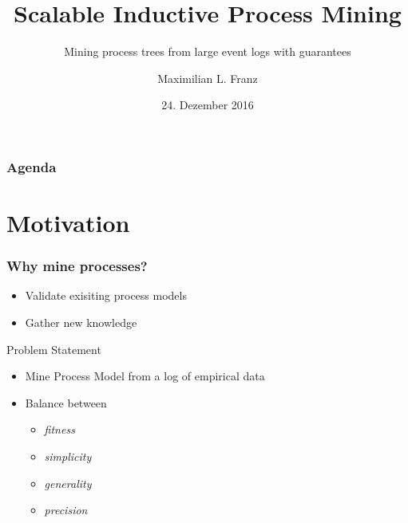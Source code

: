 \documentclass[18pt]{beamer}
\institute{Proseminar Anthropomatik: Von der Theorie zur Anwendung}
\title[Scalable Inductive Process Mining]{Scalable Inductive Process Mining}
\subtitle{Mining process trees from large event logs with guarantees}
\author{Maximilian L. Franz}
\date{24. Dezember 2016}
\begin{document}
\begin{frame}
    \titlepage
\end{frame}

\begin{frame}
    \frametitle{Agenda}
    \tableofcontents
\end{frame}

\section{Motivation} %
\label{sec:}
\begin{frame}
    \frametitle{Why mine processes?}    
    \begin{itemize}
	\item Validate exisiting process models
	\pause
	\item Gather new knowledge
\end{itemize}
\pause
\begin{block}{Problem Statement}
\begin{itemize}
\item Mine Process Model from a log of empirical data
\pause
\item Balance between 
	\begin{itemize}
		\item \emph{fitness}
		\item \emph{simplicity}
		\item \emph{generality}
		\item \emph{precision}
	\end{itemize}
\end{itemize}
\end{block}
\end{frame}
\end{document}
